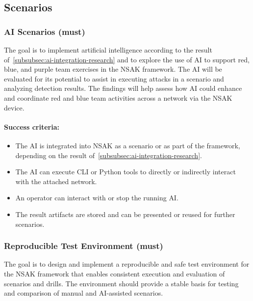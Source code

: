 \subsection{Scenarios}\label{subsec:scenarios}

\subsubsection{\gls{AI} Scenarios (must)}\label{subsubsec:ai-scenarios}

The goal is to implement artificial intelligence according to the result of~\ref{subsubsec:ai-integration-research} and to explore the use of \gls{AI} to support red, blue, and purple team exercises in the \gls{NSAK} framework.
The \gls{AI} will be evaluated for its potential to assist in executing attacks in a scenario and analyzing detection results.
The findings will help assess how \gls{AI} could enhance and coordinate red and blue team activities across a network via the \gls{NSAK} device.

\paragraph{Success criteria:}

\begin{itemize}
	\item The \gls{AI} is integrated into \gls{NSAK} as a scenario or as part of the framework, depending on the result of~\ref{subsubsec:ai-integration-research}.
	\item The \gls{AI} can execute \gls{CLI} or Python tools to directly or indirectly interact with the attached network.
	\item An operator can interact with or stop the running \gls{AI}.
	\item The result artifacts are stored and can be presented or reused for further scenarios.
\end{itemize}

\subsubsection{Reproducible Test Environment (must)}\label{subsubsec:reproducible-test-environments}

The goal is to design and implement a reproducible and safe test environment for the \gls{NSAK} framework that enables consistent execution and evaluation of scenarios and drills.
The environment should provide a stable basis for testing and comparison of manual and \gls{AI}-assisted scenarios.


